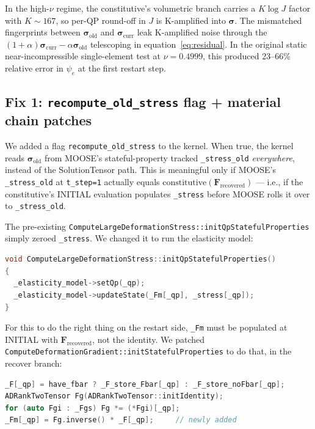 \documentclass[11pt]{article}
\newcommand{\F}{\mathbf{F}}
\newcommand{\sig}{\boldsymbol{\sigma}}
\begin{document}
In the high-$\nu$ regime, the constitutive's volumetric branch carries a $K \log J$ factor with $K \sim 167$, so per-QP round-off in $J$ is K-amplified into $\sig$. The mismatched fingerprints between $\sig_{\text{old}}$ and $\sig_{\text{curr}}$ leak K-amplified noise through the $(1+\alpha)\sig_{\text{curr}} - \alpha \sig_{\text{old}}$ telescoping in equation~\eqref{eq:residual}. In the original static near-incompressible single-element test at $\nu = 0.4999$, this produced 23--66\% relative error in $\psi_e$ at the first restart step.

\subsection{Fix 1: \texttt{recompute\_old\_stress} flag + material chain patches}

We added a flag \texttt{recompute\_old\_stress} to the kernel. When true, the kernel reads $\sig_{\text{old}}$ from MOOSE's stateful-property tracked \texttt{\_stress\_old} \emph{everywhere}, instead of the SolutionTensor path. This is meaningful only if MOOSE's \texttt{\_stress\_old} at \texttt{t\_step=1} actually equals $\text{constitutive}(\F_{\text{recovered}})$ --- i.e., if the constitutive's INITIAL evaluation populates \texttt{\_stress} before MOOSE rolls it over to \texttt{\_stress\_old}.

The pre-existing \texttt{ComputeLargeDeformationStress::initQpStatefulProperties} simply zeroed \texttt{\_stress}. We changed it to run the elasticity model:

\begin{lstlisting}[language=C++]
void ComputeLargeDeformationStress::initQpStatefulProperties()
{
  _elasticity_model->setQp(_qp);
  _elasticity_model->updateState(_Fm[_qp], _stress[_qp]);
}
\end{lstlisting}

For this to do the right thing on the restart side, \texttt{\_Fm} must be populated at INITIAL with $\F_{\text{recovered}}$, not the identity. We patched \texttt{ComputeDeformationGradient::initStatefulProperties} to do that, in the recover branch:

\begin{lstlisting}[language=C++]
_F[_qp] = have_fbar ? _F_store_Fbar[_qp] : _F_store_noFbar[_qp];
ADRankTwoTensor Fg(ADRankTwoTensor::initIdentity);
for (auto Fgi : _Fgs) Fg *= (*Fgi)[_qp];
_Fm[_qp] = Fg.inverse() * _F[_qp];     // newly added
\end{lstlisting}
\end{document}
